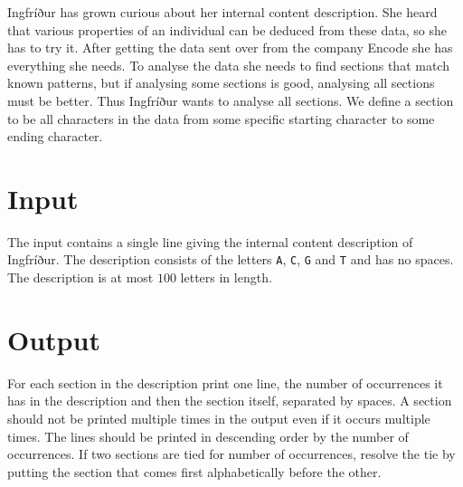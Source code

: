 
Ingfríður has grown curious about her internal content
description. She heard that various properties of an 
individual can be deduced from these data, so she has
to try it. After getting the data sent over from the company Encode
she has everything she needs. To analyse the data she
needs to find sections that match known patterns, but
if analysing some sections is good, analysing all sections
must be better. Thus Ingfríður wants to analyse all sections.
We define a section to be all characters in the data
from some specific starting character to some ending
character.

\section*{Input}
The input contains a single line giving the
internal content description of Ingfríður. The description
consists of the letters \texttt{A}, \texttt{C}, \texttt{G}
and \texttt{T} and has no spaces.
The description is at most $100$ letters in length.

\section*{Output}
For each section in the description print one line,
the number of occurrences it has in the description and
then the section itself, separated by spaces. A section
should not be printed multiple times in the output even if
it occurs multiple times. The lines should be printed in
descending order by the number of occurrences. If two
sections are tied for number of occurrences, resolve the
tie by putting the section that comes first alphabetically
before the other.
